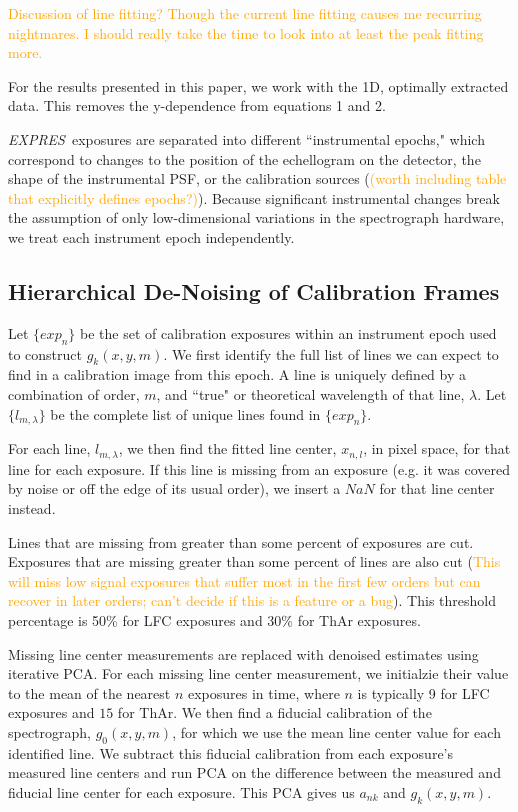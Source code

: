 \documentclass[12pt, letterpaper]{article}
\newcommand{\lz}[1]{\textcolor{orange}{#1}}
\newcommand{\project}[1]{\textsl{#1}}
\newcommand{\acronym}[1]{{\small{#1}}}
\newcommand{\expres}{\project{\acronym{EXPRES}}}
\begin{document}
\lz{Discussion of line fitting?  Though the current line fitting causes me recurring nightmares.  I should really take the time to look into at least the peak fitting more.}

For the results presented in this paper, we work with the 1D, optimally extracted data.  This removes the y-dependence from equations 1 and 2.

\expres\ exposures are separated into different ``instrumental epochs," which correspond to changes to the position of the echellogram on the detector, the shape of the instrumental PSF, or the calibration sources (\lz{(worth including table that explicitly defines epochs?)}).  Because significant instrumental changes break the assumption of only low-dimensional variations in the spectrograph hardware, we treat each instrument epoch independently.

\subsection{Hierarchical De-Noising of Calibration Frames} \label{sec:denoising}
Let $\{exp_n\}$ be the set of calibration exposures within an instrument epoch used to construct $g_k(x,y,m)$.  We first identify the full list of lines we can expect to find in a calibration image from this epoch.  A line is uniquely defined by a combination of order, $m$, and ``true" or theoretical wavelength of that line, $\lambda$.  Let $\{l_{m,\lambda}\}$ be the complete list of unique lines found in $\{exp_n\}$.

For each line, $l_{m,\lambda}$, we then find the fitted line center, $x_{n,l}$, in pixel space, for that line for each exposure.  If this line is missing from an exposure (e.g. it was covered by noise or off the edge of its usual order), we insert a $NaN$ for that line center instead.

Lines that are missing from greater than some percent of exposures are cut.  Exposures that are missing greater than some percent of lines are also cut (\lz{This will miss low signal exposures that suffer most in the first few orders but can recover in later orders; can't decide if this is a feature or a bug}).  This threshold percentage is 50\% for LFC exposures and 30\% for ThAr exposures.

Missing line center measurements are replaced with denoised estimates using iterative PCA.  For each missing line center measurement, we initialzie their value to the mean of the nearest $n$ exposures in time, where $n$ is typically 9 for LFC exposures and $15$ for ThAr.  We then find a fiducial calibration of the spectrograph,  $g_0(x,y,m)$, for which we use the mean line center value for each identified line.  We subtract this fiducial calibration from each exposure's measured line centers and run PCA on the difference between the measured and fiducial line center for each exposure.  This PCA gives us $a_{nk}$ and $g_k(x,y,m)$.
\end{document}
